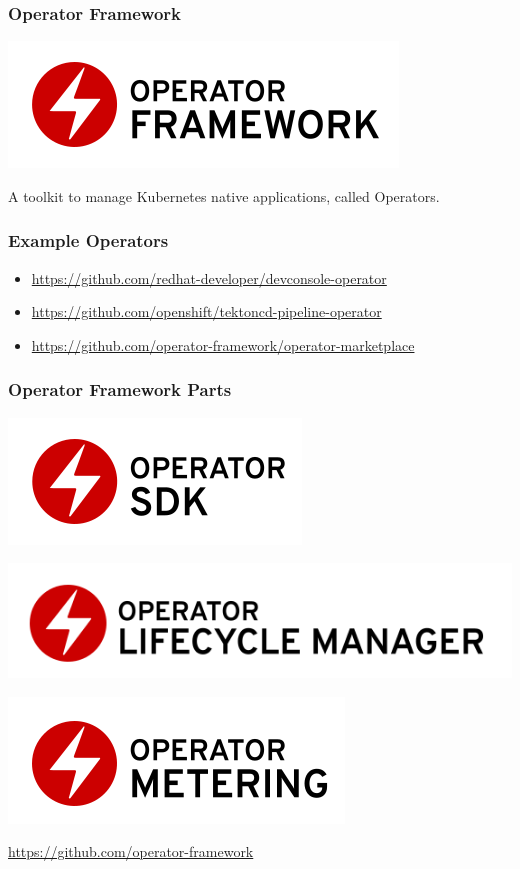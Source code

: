 \documentclass[aspectratio=169]{beamer}
\begin{document}
\begin{frame}
  \frametitle{Operator Framework}

  \includegraphics[scale=.50]{images/operator_logo_framework_color.png}

  A toolkit to manage Kubernetes native applications, called Operators.

\end{frame}

\begin{frame}
  \frametitle{Example Operators}

  \begin{itemize}
  \item \url{https://github.com/redhat-developer/devconsole-operator}
  \item \url{https://github.com/openshift/tektoncd-pipeline-operator}
  \item \url{https://github.com/operator-framework/operator-marketplace}
  \end{itemize}

\end{frame}

\begin{frame}
  \frametitle{Operator Framework Parts}

  \includegraphics[scale=.50]{images/operator_logo_sdk_color.png}

  \includegraphics[scale=.50]{images/operator_logo_lifecycle_manager_color.png}

  \includegraphics[scale=.50]{images/operator_logo_metering_color.png}

  \url{https://github.com/operator-framework}

\end{frame}
\end{document}
